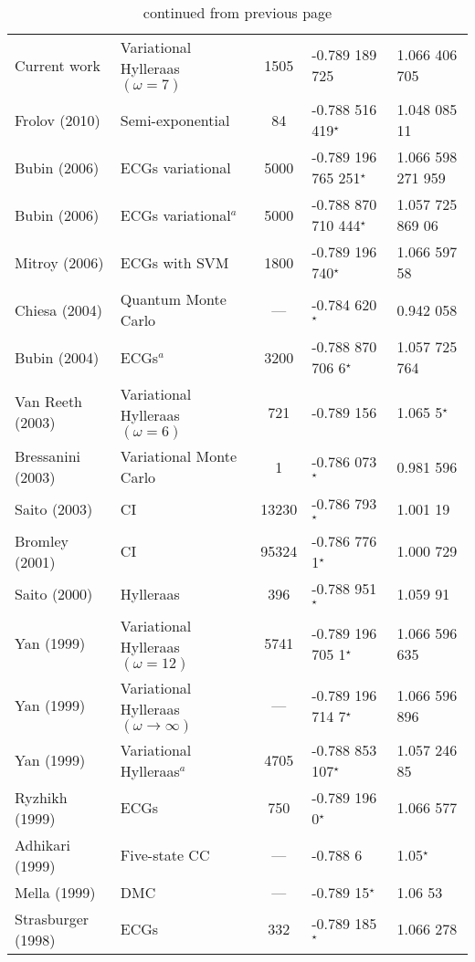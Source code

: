 \documentclass[Dissertation.tex]{subfiles}
\begin{document}
\begin{center}
\begin{longtable}{l l c l l}
\caption{continued from previous page}
\endlastfoot
\rowcolors{2}{gray!15}{white}
Current work & Variational Hylleraas $(\omega = 7)$ & 1505 & -0.789 189 725 & 1.066 406 705 \\
Frolov (2010) \cite{Frolov2010} & Semi-exponential & 84 & -0.788 516 419$^\star$ & 1.048 085 11 \\
Bubin (2006) \cite{Bubin2006} & ECGs variational & 5000 & -0.789 196 765 251$^\star$ & 1.066 598 271 959 \\
Bubin (2006) \cite{Bubin2006} & ECGs variational$^a$ & 5000 & -0.788 870 710 444$^\star$ & 1.057 725 869 06 \\
Mitroy (2006) \cite{Mitroy2006} & ECGs with SVM & 1800 & -0.789 196 740$^\star$ & 1.066 597 58 \\
Chiesa (2004) \cite{Chiesa2004} & Quantum Monte Carlo & --- & -0.784 620$^\star$ & 0.942 058 \\
Bubin (2004) \cite{Bubin2004} & ECGs$^a$ & 3200 & -0.788 870 706 6$^\star$ & 1.057 725 764 \\
Van Reeth (2003) \cite{VanReeth2003} & Variational Hylleraas $(\omega = 6)$ & 721 & -0.789 156 & 1.065 5$^\star$ \\
Bressanini (2003) \cite{Bressanini2003} & Variational Monte Carlo & 1 & -0.786 073$^\star$ & 0.981 596 \\
Saito (2003) \cite{Saito2003a} & CI & 13230 & -0.786 793$^\star$ & 1.001 19 \\
Bromley (2001) \cite{Bromley2001} & CI & 95324 & -0.786 776 1$^\star$ & 1.000 729 \\
Saito (2000) \cite{Saito2000} & Hylleraas & 396 & -0.788 951$^\star$ & 1.059 91 \\
Yan (1999) \cite{Yan1999} & Variational Hylleraas $(\omega = 12)$ & 5741 & -0.789 196 705 1$^\star$ & 1.066 596 635 \\
Yan (1999) \cite{Yan1999} & Variational Hylleraas $(\omega \rightarrow \infty)$ & --- & -0.789 196 714 7$^\star$ & 1.066 596 896 \\
Yan (1999) \cite{Yan1999a} & Variational Hylleraas$^a$ & 4705 & -0.788 853 107$^\star$ & 1.057 246 85 \\
Ryzhikh (1999) \cite{Ryzhikh1999} & ECGs & 750 & -0.789 196 0$^\star$ & 1.066 577 \\
Adhikari (1999) \cite{Adhikari1999} & Five-state CC & --- & -0.788 6 & 1.05$^\star$ \\
Mella (1999) \cite{Mella1999} & DMC & --- & -0.789 15$^\star$ & 1.06 53 \\
Strasburger (1998) \cite{Strasburger1998} & ECGs & 332 & -0.789 185$^\star$ & 1.066 278 \\

\end{longtable}
\end{center}
\end{document}
